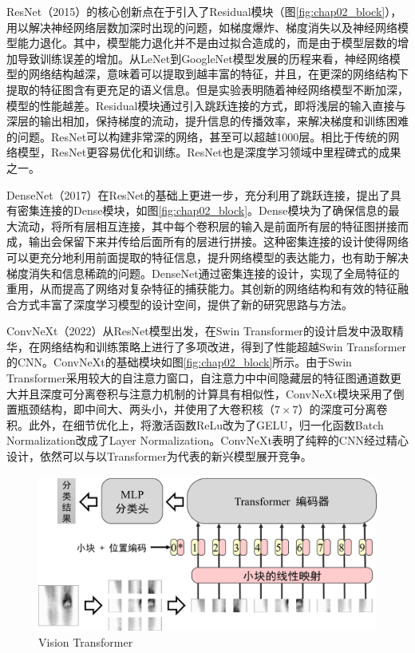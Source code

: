 ResNet\cite{he2016deep}（2015）的核心创新点在于引入了Residual模块（图\ref{fig:chap02_block}），用以解决神经网络层数加深时出现的问题，如梯度爆炸、梯度消失以及神经网络模型能力退化。其中，模型能力退化并不是由过拟合造成的，而是由于模型层数的增加导致训练误差的增加。从LeNet到GoogleNet模型发展的历程来看，神经网络模型的网络结构越深，意味着可以提取到越丰富的特征，并且，在更深的网络结构下提取的特征图含有更充足的语义信息。但是实验表明随着神经网络模型不断加深，模型的性能越差。Residual模块通过引入跳跃连接的方式，即将浅层的输入直接与深层的输出相加，保持梯度的流动，提升信息的传播效率，来解决梯度和训练困难的问题。ResNet可以构建非常深的网络，甚至可以超越1000层。相比于传统的网络模型，ResNet更容易优化和训练。ResNet也是深度学习领域中里程碑式的成果之一。

DenseNet\cite{huang2017densely}（2017）在ResNet的基础上更进一步，充分利用了跳跃连接，提出了具有密集连接的Dense模块，如图\ref{fig:chap02_block}。Dense模块为了确保信息的最大流动，将所有层相互连接，其中每个卷积层的输入是前面所有层的特征图拼接而成，输出会保留下来并传给后面所有的层进行拼接。这种密集连接的设计使得网络可以更充分地利用前面提取的特征信息，提升网络模型的表达能力，也有助于解决梯度消失和信息稀疏的问题。DenseNet通过密集连接的设计，实现了全局特征的重用，从而提高了网络对复杂特征的捕获能力。其创新的网络结构和有效的特征融合方式丰富了深度学习模型的设计空间，提供了新的研究思路与方法。

ConvNeXt\cite{liu2022convnet}（2022）从ResNet模型出发，在Swin Transformer\cite{liu2021swin}的设计启发中汲取精华，在网络结构和训练策略上进行了多项改进，得到了性能超越Swin Transformer的CNN。ConvNeXt的基础模块如图\ref{fig:chap02_block}所示。由于Swin Transformer采用较大的自注意力窗口，自注意力中中间隐藏层的特征图通道数更大并且深度可分离卷积与注意力机制的计算具有相似性，ConvNeXt模块采用了倒置瓶颈结构，即中间大、两头小，并使用了大卷积核（\(7\times7\)）的深度可分离卷积。此外，在细节优化上，将激活函数ReLu改为了GELU，归一化函数Batch Normalization\cite{ioffe2015batch}改成了Layer Normalization。ConvNeXt表明了纯粹的CNN经过精心设计，依然可以与以Transformer为代表的新兴模型展开竞争。

\begin{figure}[htbp]
  \centering
  \includegraphics[width=\textwidth]{figures/chap02_vit.jpg}
  \caption{Vision Transformer}
  \label{fig:chap02_vit}
\end{figure}

